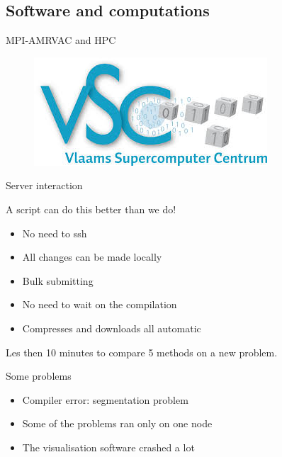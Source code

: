 \subsection{Software and computations}

\begin{frame}{MPI-AMRVAC and HPC}


\begin{figure}
\centering
\includegraphics[width=0.7\linewidth]{../../figs/vsc}
\label{fig:vsc}
\end{figure}

\end{frame}


\begin{frame}{Server interaction}

A script can do this better than we do!

\begin{itemize}
\item No need to ssh
\item All changes can be made locally 
\item Bulk submitting
\item No need to wait on the compilation
\item Compresses and downloads all automatic
\end{itemize}

Les then 10 minutes to compare 5 methods on a new problem.
\end{frame}

\begin{frame}{Some problems}
\vspace{2cm}
\begin{itemize}
\item Compiler error: segmentation problem
\item Some of the problems ran only on one node 
\item The visualisation software crashed a lot
\end{itemize}

\end{frame}